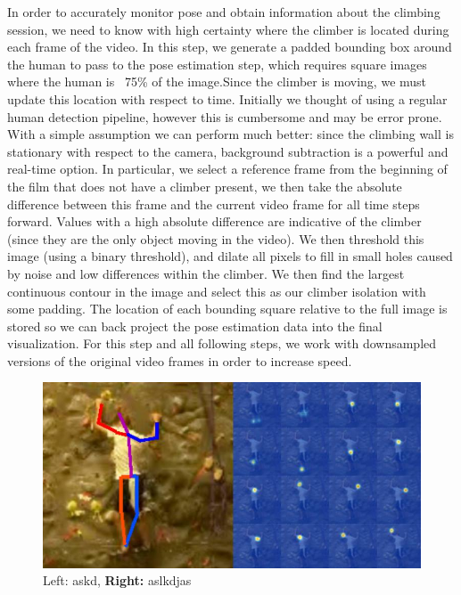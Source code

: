 \documentclass{chi2009}
\begin{document}
In order to accurately monitor pose and obtain information about the climbing session, we need to know with high certainty where the climber is located during each frame of the video. In this step, we generate a padded bounding box around the human to pass to the pose estimation step, which requires square images where the human is ~75\% of the image.Since the climber is moving, we must update this location with respect to time. Initially we thought of using a regular human detection pipeline, however this is cumbersome and may be error prone. With a simple assumption we can perform much better: since the climbing wall is stationary with respect to the camera, background subtraction is a powerful and real-time option. In particular, we select a reference frame from the beginning of the film that does not have a climber present, we then take the absolute difference between this frame and the current video frame for all time steps forward. Values with a high absolute difference are indicative of the climber (since they are the only object moving in the video). We then threshold this image (using a binary threshold), and dilate all pixels to fill in small holes caused by noise and low differences within the climber. We then find the largest continuous contour in the image and select this as our climber isolation with some padding. The location of each bounding square relative to the full image is stored so we can back project the pose estimation data into the final visualization. For this step and all following steps, we work with downsampled versions of the original video frames in order to increase speed.

\begin{figure}[t]
  \centering
  \includegraphics[keepaspectratio, width=\textwidth]{figs/pose.png}
  \caption{Left: \normalfont askd, \textbf{Right:} aslkdjas}
  \label{fig:user}
\end{figure}
\end{document}
